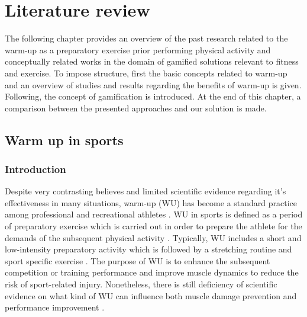 \chapter{Literature review}\label{chapter:warmup}
The following chapter provides an overview of the past research related to the warm-up as a preparatory exercise prior performing physical activity and conceptually related works in the domain of gamified solutions relevant to fitness and exercise. To impose structure, first the basic concepts related to warm-up and an overview of studies and results regarding the benefits of warm-up is given. Following, the concept of gamification is introduced. At the end of this chapter, a comparison between the presented approaches and our solution is made.
\section{Warm up in sports}
\subsection{Introduction}
Despite very contrasting believes and limited scientific evidence regarding it's effectiveness in many situations, warm-up (WU) has become a standard practice among professional and
recreational athletes \cite{bishop2003warm1, bishop2003warm2, shellock1985warming}. WU in sports is defined as a period of preparatory exercise which is carried out in order to prepare the athlete for the demands of the subsequent physical activity \cite{karvonen1992importance, woods2007warm, hedrick1992exercise}.
Typically, WU includes a short and low-intensity preparatory activity which is followed by a stretching routine and sport specific exercise \cite{safran1989warm}. 
The purpose of WU is to enhance the subsequent competition or training performance and improve muscle dynamics to reduce the risk of sport-related injury\cite{bishop2003warm1, shellock1985warming, knudson2008warm}. 
Nonetheless, there is still deficiency of scientific evidence on what kind of WU can influence both muscle damage prevention and performance improvement \cite{safran1989warm}.\\ %
